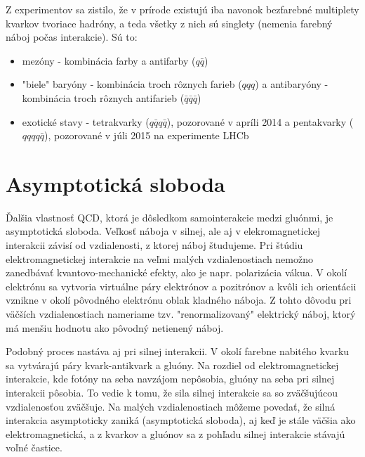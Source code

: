 \documentclass[thesismargins, thesislinespacing]{rnthesis}
\begin{document}
Z experimentov sa zistilo, že v prírode existujú iba navonok bezfarebné multiplety kvarkov tvoriace hadróny, a teda všetky z nich sú singlety (nemenia farebný náboj počas interakcie). Sú to:
\begin{itemize}
	\item mezóny - kombinácia farby a antifarby ($q \bar q$)
	\item "biele" baryóny - kombinácia troch rôznych farieb ($qqq$) a antibaryóny - kombinácia troch rôznych antifarieb ($\bar q \bar q \bar q$)
	\item exotické stavy - tetrakvarky ($q \bar q q \bar q$), pozorované v apríli 2014 \cite{tetra} a pentakvarky ($qqqq \bar q $), pozorované v júli 2015 na experimente LHCb \cite{2}
\end{itemize}

\section{Asymptotická sloboda}
Ďalšia vlastnosť QCD, ktorá je dôsledkom samointerakcie medzi gluónmi, je asymptotická sloboda. 
Veľkosť náboja v silnej, ale aj v elekromagnetickej interakcii závisí od vzdialenosti, z ktorej náboj študujeme. Pri štúdiu elektromagnetickej interakcie na veľmi malých vzdialenostiach nemožno zanedbávať kvantovo-mechanické efekty, ako je napr. polarizácia vákua. V okolí elektrónu sa vytvoria virtuálne páry elektrónov a pozitrónov a kvôli ich  orientácii vznikne v okolí pôvodného elektrónu oblak kladného náboja. Z tohto dôvodu pri väčších vzdialenostiach nameriame tzv. "renormalizovaný" \-e\-lektrický náboj, ktorý má menšiu hodnotu ako pôvodný netienený náboj.

Podobný proces nastáva aj pri silnej interakcii. V okolí farebne nabitého kvarku sa vytvárajú páry kvark-antikvark a gluóny. Na rozdiel od elektromagnetickej interakcie, kde fotóny na seba navzájom nepôsobia, gluóny na seba pri silnej interakcii pôsobia. To vedie k tomu, že sila silnej interakcie sa so zväčšujúcou vzdialenosťou zväčšuje. Na malých vzdialenostiach môžeme povedať, že silná interakcia asymptoticky zaniká (asymptotická sloboda), aj keď je stále väčšia ako elektromagnetická, a z kvarkov a gluónov sa z pohľadu silnej interakcie stávajú voľné častice. 
\end{document}
